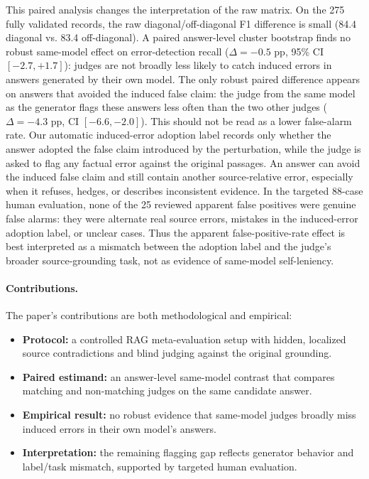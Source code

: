 This paired analysis changes the interpretation of the raw matrix. On the 275 fully validated records, the raw diagonal/off-diagonal F1 difference is small (84.4 diagonal vs. 83.4 off-diagonal). A paired answer-level cluster bootstrap finds no robust same-model effect on error-detection recall ($\Delta=-0.5$ pp, 95\% CI $[-2.7,+1.7]$): judges are not broadly less likely to catch induced errors in answers generated by their own model. The only robust paired difference appears on answers that avoided the induced false claim: the judge from the same model as the generator flags these answers less often than the two other judges ($\Delta=-4.3$ pp, CI $[-6.6,-2.0]$). This should not be read as a lower false-alarm rate. Our automatic induced-error adoption label records only whether the answer adopted the false claim introduced by the perturbation, while the judge is asked to flag any factual error against the original passages. An answer can avoid the induced false claim and still contain another source-relative error, especially when it refuses, hedges, or describes inconsistent evidence. In the targeted 88-case human evaluation, none of the 25 reviewed apparent false positives were genuine false alarms: they were alternate real source errors, mistakes in the induced-error adoption label, or unclear cases. Thus the apparent false-positive-rate effect is best interpreted as a mismatch between the adoption label and the judge's broader source-grounding task, not as evidence of same-model self-leniency.

\paragraph{Contributions.}
The paper's contributions are both methodological and empirical:
\begin{itemize}[leftmargin=*,itemsep=1pt,topsep=2pt]
  \item \textbf{Protocol:} a controlled RAG meta-evaluation setup with hidden, localized source contradictions and blind judging against the original grounding.
  \item \textbf{Paired estimand:} an answer-level same-model contrast that compares matching and non-matching judges on the same candidate answer.
  \item \textbf{Empirical result:} no robust evidence that same-model judges broadly miss induced errors in their own model's answers.
  \item \textbf{Interpretation:} the remaining flagging gap reflects generator behavior and label/task mismatch, supported by targeted human evaluation.
\end{itemize}

